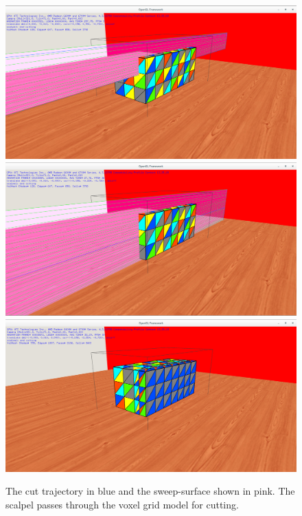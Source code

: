 \begin{figure}[H]
  \centering
  \includegraphics[width=0.6\linewidth]{figures/cutting/cubecut02.png}
  \includegraphics[width=0.6\linewidth]{figures/cutting/cubecut04.png}
  \includegraphics[width=0.6\linewidth]{figures/cutting/cubecut05.png}
  \caption{\label{fig:sweepsurf}
  {The cut trajectory in blue and the sweep-surface shown in pink. The scalpel passes through the voxel grid model for cutting.}
}
\end{figure}

